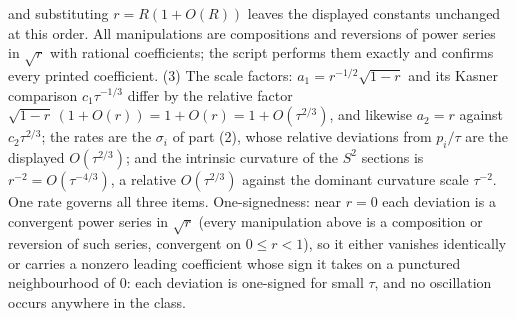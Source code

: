 and substituting $r = R(1 + O(R))$ leaves the displayed constants unchanged at this order. All manipulations are compositions and reversions of power series in $\sqrt r$ with rational coefficients; the script performs them exactly and confirms every printed coefficient. (3) The scale factors: $a_1 = r^{-1/2}\sqrt{1-r}$ and its Kasner comparison $c_1\tau^{-1/3}$ differ by the relative factor $\sqrt{1-r}\,(1 + O(r)) = 1 + O(r) = 1 + O(\tau^{2/3})$, and likewise $a_2 = r$ against $c_2\tau^{2/3}$; the rates are the $\sigma_i$ of part (2), whose relative deviations from $p_i/\tau$ are the displayed $O(\tau^{2/3})$; and the intrinsic curvature of the $S^2$ sections is $r^{-2} = O(\tau^{-4/3})$, a relative $O(\tau^{2/3})$ against the dominant curvature scale $\tau^{-2}$. One rate governs all three items. One-signedness: near $r = 0$ each deviation is a convergent power series in $\sqrt r$ (every manipulation above is a composition or reversion of such series, convergent on $0 \le r < 1$), so it either vanishes identically or carries a nonzero leading coefficient whose sign it takes on a punctured neighbourhood of $0$: each deviation is one-signed for small $\tau$, and no oscillation occurs anywhere in the class.
